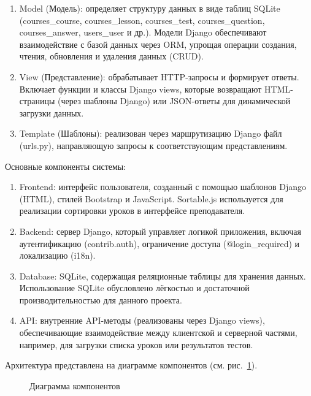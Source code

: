 \begin{enumerate}
	\item {Model} (Модель): определяет структуру данных в виде таблиц SQLite (courses\_course, courses\_lesson, courses\_test, courses\_question, courses\_answer, users\_user и др.). Модели Django обеспечивают взаимодействие с базой данных через ORM, упрощая операции создания, чтения, обновления и удаления данных (CRUD).
	\item {View} (Представление): обрабатывает HTTP-запросы и формирует ответы. Включает функции и классы Django views, которые возвращают HTML-страницы (через шаблоны Django) или JSON-ответы для динамической загрузки данных.
	\item {Template} (Шаблоны): реализован через маршрутизацию Django файл (urls.py), направляющую запросы к соответствующим представлениям.
\end{enumerate}

Основные компоненты системы:
\begin{enumerate}
	\item {Frontend}: интерфейс пользователя, созданный с помощью шаблонов Django (HTML), стилей Bootstrap и JavaScript. Sortable.js используется для реализации сортировки уроков в интерфейсе преподавателя.
	\item {Backend}: сервер Django, который управляет логикой приложения, включая аутентификацию (contrib.auth), ограничение доступа (@login\_required) и локализацию (i18n).
	\item {Database}: SQLite, содержащая реляционные таблицы для хранения данных. Использование SQLite обусловлено лёгкостью и достаточной производительностью для данного проекта.
	\item {API}: внутренние API-методы (реализованы через Django views), обеспечивающие взаимодействие между клиентской и серверной частями, например, для загрузки списка уроков или результатов тестов.
\end{enumerate}

Архитектура представлена на диаграмме компонентов (см. рис.~\ref{diag:image}).
\newpage
\begin{figure}[h]
	\caption{Диаграмма компонентов}
	\label{diag:image}
\end{figure}

